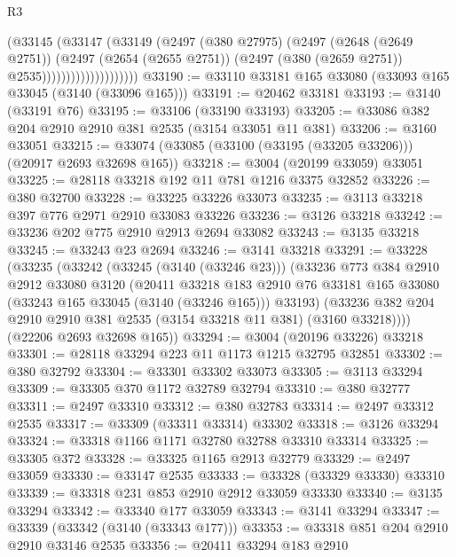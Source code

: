 \begin{lexlean}{R3}
\begin{coremodule}
                              (@33145
                                (@33147
                                  (@33149
                                    (@2497
                                      (@380 @27975)
                                      (@2497
                                        (@2648 (@2649 @2751))
                                        (@2497
                                          (@2654 (@2655 @2751))
                                          (@2497 (@380 (@2659 @2751)) @2535))))))))))))))))))))
@33190 := @33110 @33181 @165 @33080 (@33093 @165 @33045 (@3140 (@33096 @165)))
@33191 := @20462 @33181
@33193 := @3140 (@33191 @76)
@33195 := @33106 (@33190 @33193)
@33205 := @33086 @382 @204 @2910 @2910 @381 @2535 (@3154 @33051 @11 @381)
@33206 := @3160 @33051
@33215 := @33074 (@33085 (@33100 (@33195 (@33205 @33206))) (@20917 @2693 @32698 @165))
@33218 := @3004 (@20199 @33059) @33051
@33225 := @28118 @33218 @192 @11 @781 @1216 @3375 @32852
@33226 := @380 @32700
@33228 := @33225 @33226 @33073
@33235 := @3113 @33218 @397 @776 @2971 @2910 @33083 @33226
@33236 := @3126 @33218
@33242 := @33236 @202 @775 @2910 @2913 @2694 @33082
@33243 := @3135 @33218
@33245 := @33243 @23 @2694
@33246 := @3141 @33218
@33291 := @33228
    (@33235
      (@33242
        (@33245 (@3140 (@33246 @23)))
        (@33236
          @773
          @384
          @2910
          @2912
          @33080
          @3120
          (@20411
            @33218
            @183
            @2910
            @76
            @33181
            @165
            @33080
            (@33243 @165 @33045 (@3140 (@33246 @165)))
            @33193)
          (@33236 @382 @204 @2910 @2910 @381 @2535 (@3154 @33218 @11 @381) (@3160 @33218))))
      (@22206 @2693 @32698 @165))
@33294 := @3004 (@20196 @33226) @33218
@33301 := @28118 @33294 @223 @11 @1173 @1215 @32795 @32851
@33302 := @380 @32792
@33304 := @33301 @33302 @33073
@33305 := @3113 @33294
@33309 := @33305 @370 @1172 @32789 @32794
@33310 := @380 @32777
@33311 := @2497 @33310
@33312 := @380 @32783
@33314 := @2497 @33312 @2535
@33317 := @33309 (@33311 @33314) @33302
@33318 := @3126 @33294
@33324 := @33318 @1166 @1171 @32780 @32788 @33310 @33314
@33325 := @33305 @372
@33328 := @33325 @1165 @2913 @32779
@33329 := @2497 @33059
@33330 := @33147 @2535
@33333 := @33328 (@33329 @33330) @33310
@33339 := @33318 @231 @853 @2910 @2912 @33059 @33330
@33340 := @3135 @33294
@33342 := @33340 @177 @33059
@33343 := @3141 @33294
@33347 := @33339 (@33342 (@3140 (@33343 @177)))
@33353 := @33318 @851 @204 @2910 @2910 @33146 @2535
@33356 := @20411 @33294 @183 @2910

\end{coremodule}
\end{lexlean}
